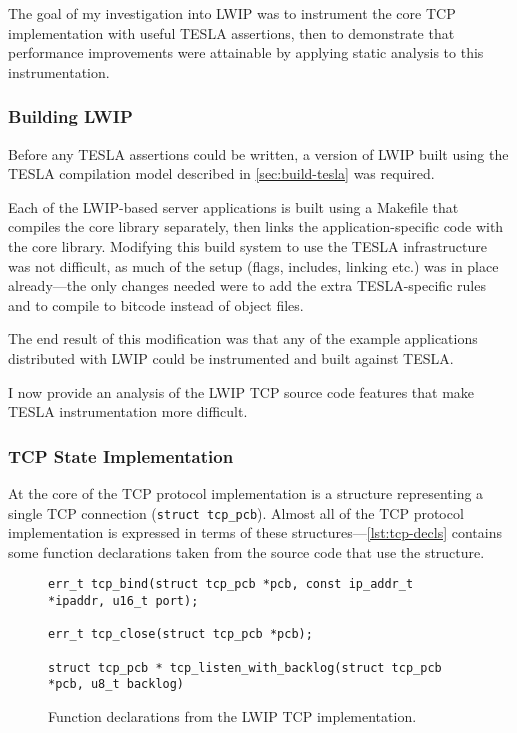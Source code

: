 The goal of my investigation into LWIP was to instrument the core TCP
implementation with useful TESLA assertions, then to demonstrate that
performance improvements were attainable by applying static analysis to
this instrumentation.

\subsubsection{Building LWIP}

Before any TESLA assertions could be written, a version of LWIP built
using the TESLA compilation model described in \autoref{sec:build-tesla}
was required.

Each of the LWIP-based server applications is built using a Makefile
that compiles the core library separately, then links the
application-specific code with the core library. Modifying this build
system to use the TESLA infrastructure was not difficult, as much of the
setup (flags, includes, linking etc.) was in place already---the only
changes needed were to add the extra TESLA-specific rules and to compile
to bitcode instead of object files.

The end result of this modification was that any of the example applications
distributed with LWIP could be instrumented and built against TESLA.

I now provide an analysis of the LWIP TCP source code features that make
TESLA instrumentation more difficult.

\subsubsection{TCP State Implementation}

At the core of the TCP protocol implementation is a structure
representing a single TCP connection (\texttt{struct tcp_pcb}).
Almost all of the TCP protocol implementation is expressed in terms of
these structures---\autoref{lst:tcp-decls} contains some function
declarations taken from the source code that use the structure.

\begin{figure}
  \begin{verbatim}
err_t tcp_bind(struct tcp_pcb *pcb, const ip_addr_t *ipaddr, u16_t port);

err_t tcp_close(struct tcp_pcb *pcb);

struct tcp_pcb * tcp_listen_with_backlog(struct tcp_pcb *pcb, u8_t backlog)
  \end{verbatim}
  \caption{Function declarations from the LWIP TCP implementation.}
  \label{lst:tcp-decls}
\end{figure}

